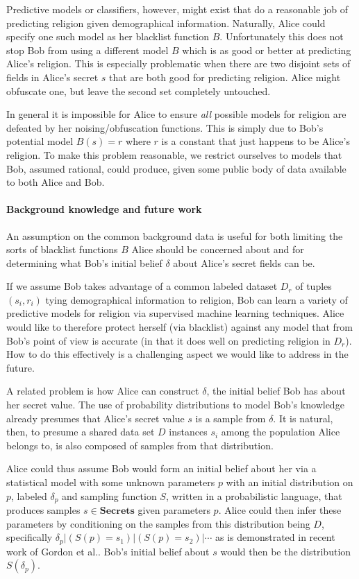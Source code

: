 \documentclass{article} %
\newcommand{\secrets}[0]{\textbf{Secrets}}
\newcommand{\asecret}[0]{s}
\newcommand{\rsecret}[0]{s}
\newcommand{\cond}[0]{|}
\theoremstyle{plain} %
\theoremstyle{definition} %
\begin{document}
Predictive models or classifiers, however, might exist that do a
reasonable job of predicting religion given demographical
information. Naturally, Alice could specify one such model as her
blacklist function $ B $. Unfortunately this does not stop Bob from
using a different model $ B $ which is as good or better at predicting
Alice's religion. This is especially problematic when there are two
disjoint sets of fields in Alice's secret $ \rsecret $ that are both
good for predicting religion. Alice might obfuscate one, but leave the
second set completely untouched.

In general it is impossible for Alice to ensure \emph{all} possible
models for religion are defeated by her noising/obfuscation
functions. This is simply due to Bob's potential model $ B(s) = r $
where $ r $ is a constant that just happens to be Alice's religion. To
make this problem reasonable, we restrict ourselves to models that
Bob, assumed rational, could produce, given some public body of data
available to both Alice and Bob.

\paragraph*{Background knowledge and future work} An assumption on the common
background data is useful for both limiting the sorts of blacklist
functions $ B $ Alice should be concerned about and for determining
what Bob's initial belief $ \delta $ about Alice's secret fields can
be.

If we assume Bob takes advantage of a common labeled dataset $ D_r $
of tuples $ (s_i, r_i) $ tying demographical information to religion,
Bob can learn a variety of predictive models for religion via
supervised machine learning techniques. Alice would like to therefore
protect herself (via blacklist) against any model that from Bob's
point of view is accurate (in that it does well on predicting religion
in $ D_r $). How to do this effectively is a challenging aspect we
would like to address in the future.

A related problem is how Alice can construct $ \delta $, the initial
belief Bob has about her secret value. The use of probability
distributions to model Bob's knowledge already presumes that Alice's
secret value $ \rsecret $ is a sample from $ \delta $. It is natural,
then, to presume a shared data set $ D $ instances $ \asecret_i $ among the
population Alice belongs to, is also composed of samples from that
distribution.

Alice could thus assume Bob would form an initial belief about her via
a statistical model with some unknown parameters $ p $ with an initial
distribution on $ p $, labeled $ \delta_p $ and sampling function $ S
$, written in a probabilistic language, that produces samples $
\asecret \in \secrets $ given parameters $ p $. Alice could then infer
these parameters by conditioning on the samples from this distribution
being $ D $, specifically $ \delta_p \cond (S(p) = \asecret_1) \cond
(S(p) = \asecret_2) \cond \cdots $ as is demonstrated in recent work
of Gordon et al.\cite{gordon13model}. Bob's initial belief about $
\rsecret $ would then be the distribution $ S(\delta_p) $.
\end{document}
